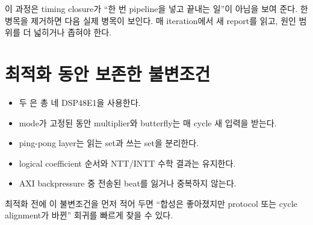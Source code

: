 이 과정은 timing closure가 ``한 번 pipeline을 넣고 끝내는 일''이 아님을 보여
준다. 한 병목을 제거하면 다음 실제 병목이 보인다. 매 iteration에서 새 report를
읽고, 원인 범위를 더 넓히거나 좁혀야 한다.

\section{최적화 동안 보존한 불변조건}

\begin{itemize}
  \item 두 은 총 네 DSP48E1을 사용한다.
  \item mode가 고정된 동안 multiplier와 butterfly는 매 cycle 새 입력을 받는다.
  \item ping-pong layer는 읽는 set과 쓰는 set을 분리한다.
  \item logical coefficient 순서와 NTT/INTT 수학 결과는 유지한다.
  \item AXI backpressure 중 전송된 beat를 잃거나 중복하지 않는다.
\end{itemize}

최적화 전에 이 불변조건을 먼저 적어 두면 ``합성은 좋아졌지만 protocol 또는
cycle alignment가 바뀐'' 회귀를 빠르게 찾을 수 있다.

